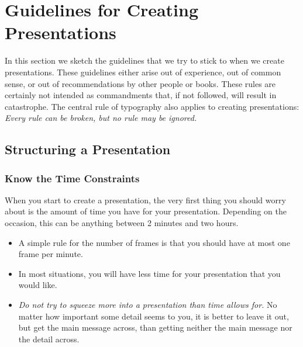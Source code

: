 %
%
%

\section{Guidelines for Creating Presentations}
\label{section-guidelines}

In this section we sketch the guidelines that we try to stick to when we create presentations. These guidelines either arise out of experience, out of common sense, or out of recommendations by other people or books. These rules are certainly not intended as commandments that, if not followed, will result in catastrophe. The central rule of typography also applies to creating presentations: \emph{Every rule can be broken, but no rule may be ignored.}


\subsection{Structuring a Presentation}
\label{section-structure-guidelines}

\subsubsection{Know the Time Constraints}

When you start to create a presentation, the very first thing you should worry about is the amount of time you have for your presentation. Depending on the occasion, this can be anything between 2 minutes and two hours.
\begin{itemize}
\item
  A simple rule for the number of frames is that you should have at most one frame per minute.
\item
  In most situations, you will have less time for your presentation that you would like.
\item
  \emph{Do not try to squeeze more into a presentation than time allows for.} No matter how important some detail seems to you, it is better to leave it out, but get the main message across, than getting neither the main message nor the detail across.
\end{itemize}

